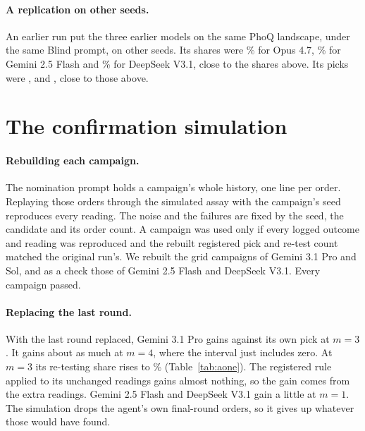 \paragraph{A replication on other seeds.} An earlier run put the three earlier models on the same PhoQ landscape,
under the same Blind prompt, on other seeds. Its shares were
\nPqOamShareOpus\% \nPqOamShareOpusci{} for Opus 4.7, \nPqOamShareFlash\% \nPqOamShareFlashci{} for Gemini 2.5 Flash
and \nPqOamShareDeep\% \nPqOamShareDeepci{} for DeepSeek V3.1, close to the shares above. Its picks were
\nPqOamPickOpus, \nPqOamPickFlash{} and \nPqOamPickDeep, close to those above.

\section{The confirmation simulation}
\label{app:aone}

\paragraph{Rebuilding each campaign.} The nomination prompt holds a campaign's whole history, one line per order.
Replaying those orders through the simulated assay with the campaign's seed reproduces every reading. The noise and the failures are fixed by the seed, the candidate and its order count. A campaign was used only if every
logged outcome and reading was reproduced and the rebuilt registered pick and re-test count matched the original run's.
We rebuilt the grid campaigns of Gemini 3.1 Pro and Sol, and as a check those of Gemini 2.5 Flash and DeepSeek V3.1.
Every campaign passed.

\paragraph{Replacing the last round.} With the last round replaced, Gemini 3.1 Pro gains against its own pick at $m = 3$. It gains about as much at $m = 4$, where the interval just includes zero. At $m = 3$ its re-testing share rises to \nAoneProShareAfter\% (Table~\ref{tab:aone}). The registered rule applied
to its unchanged readings gains almost nothing, so the gain comes from the extra readings. Gemini 2.5 Flash and
DeepSeek V3.1 gain a little at $m = 1$. The simulation drops the agent's own final-round orders, so it gives up
whatever those would have found.

